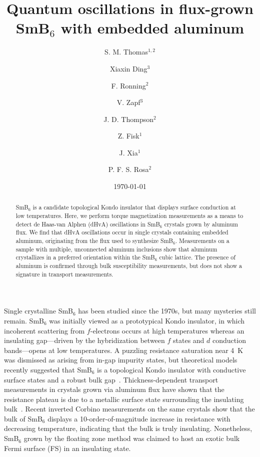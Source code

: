 \documentclass[twocolumn,preprintnumbers,amsmath,amssymb]{revtex4}
\begin{document}
\title{Quantum oscillations in flux-grown SmB$_6$ with embedded aluminum}
\author{S. M. Thomas$^{1,2}$}
\author{Xiaxin Ding$^{3}$}
\author{F. Ronning$^{2}$}
\author{V. Zapf$^{3}$}
\author{J. D. Thompson$^{2}$}
\author{Z. Fisk$^{1}$}
\author{J. Xia$^{1}$}
\author{P. F. S. Rosa$^{2}$}

\date{\today}

\begin{abstract}
SmB$_6$ is a candidate topological Kondo insulator that displays surface conduction at low temperatures.
Here, we perform torque magnetization measurements as a means to detect de Haas-van Alphen (dHvA) oscillations in SmB$_6$ crystals grown by aluminum flux.
We find that dHvA oscillations occur in single crystals containing embedded aluminum, originating from the flux used to synthesize SmB$_{6}$. 
Measurements on a sample with multiple, unconnected aluminum inclusions show that aluminum crystallizes in a preferred orientation within the SmB$_6$ cubic lattice.
The presence of aluminum is confirmed through bulk susceptibility measurements, but does not show a signature in transport measurements.
\end{abstract}

\maketitle


Single crystalline SmB$_6$ has been studied since the 1970s, but many mysteries still remain.
SmB$_6$ was initially viewed as a prototypical Kondo insulator,
in which incoherent scattering from $f$-electrons occurs at high temperatures whereas an insulating gap---driven by the hybridization between $f$ states and $d$ conduction bands---opens at low temperatures\cite{Fisk1996}.
A puzzling resistance saturation near 4~K was dismissed as arising from in-gap impurity states\cite{Menth1969},
but theoretical models recently suggested that SmB$_6$ is a topological Kondo insulator with conductive surface states and a robust bulk gap~\cite{Dzero2010,Takimoto2011}.
Thickness-dependent transport measurements in crystals grown via aluminum flux have shown that the resistance plateau is due to a metallic surface state surrounding the insulating 
bulk~\cite{Kim2013, Wolgast2013}.
Recent inverted Corbino measurements on the same crystals show that the bulk of SmB$_6$ displays a 10-order-of-magnitude increase in resistance with decreasing temperature, 
indicating that the bulk is truly insulating.\cite{Eo2018}
Nonetheless, SmB$_{6}$ grown by the floating zone method was claimed to host an exotic bulk Fermi surface (FS) in an insulating state.\cite{Tan2015}
\end{document}
